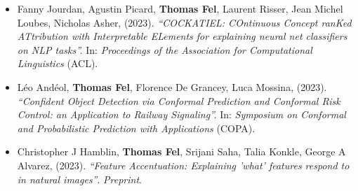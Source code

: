 \begin{itemize}
    \item Fanny Jourdan, Agustin Picard, \textbf{Thomas Fel}, Laurent Risser, Jean Michel Loubes, Nicholas Asher, (2023). \textit{``COCKATIEL: COntinuous Concept ranKed ATtribution with Interpretable ELements for explaining neural net classifiers on NLP tasks''.} In: \textit{Proceedings of the Association for Computational Linguistics} (\textcolor{confcolor}{ACL}).

    \item Léo Andéol, \textbf{Thomas Fel}, Florence De Grancey, Luca Mossina, (2023). \textit{``Confident Object Detection via Conformal Prediction and Conformal Risk Control: an Application to Railway Signaling''.} In: \textit{Symposium on Conformal and Probabilistic Prediction with Applications} (\textcolor{confcolor}{COPA}).

    \item Christopher J Hamblin, \textbf{Thomas Fel}, Srijani Saha, Talia Konkle, George A Alvarez, (2023). \textit{``Feature Accentuation: Explaining 'what' features respond to in natural images''}. \textit{Preprint}.

\end{itemize}
